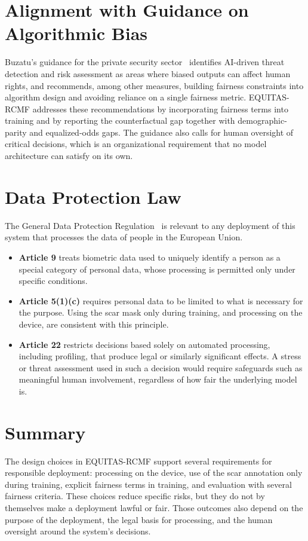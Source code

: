 \section{Alignment with Guidance on Algorithmic Bias}
Buzatu's guidance for the private security sector~\cite{buzatu2024} identifies AI-driven threat detection and risk assessment as areas where biased outputs can affect human rights, and recommends, among other measures, building fairness constraints into algorithm design and avoiding reliance on a single fairness metric. EQUITAS-RCMF addresses these recommendations by incorporating fairness terms into training and by reporting the counterfactual gap together with demographic-parity and equalized-odds gaps. The guidance also calls for human oversight of critical decisions, which is an organizational requirement that no model architecture can satisfy on its own.

\section{Data Protection Law}
The General Data Protection Regulation~\cite{gdpr2016} is relevant to any deployment of this system that processes the data of people in the European Union.
\begin{itemize}
    \item \textbf{Article 9} treats biometric data used to uniquely identify a person as a special category of personal data, whose processing is permitted only under specific conditions.
    \item \textbf{Article 5(1)(c)} requires personal data to be limited to what is necessary for the purpose. Using the scar mask only during training, and processing on the device, are consistent with this principle.
    \item \textbf{Article 22} restricts decisions based solely on automated processing, including profiling, that produce legal or similarly significant effects. A stress or threat assessment used in such a decision would require safeguards such as meaningful human involvement, regardless of how fair the underlying model is.
\end{itemize}

\section{Summary}
The design choices in EQUITAS-RCMF support several requirements for responsible deployment: processing on the device, use of the scar annotation only during training, explicit fairness terms in training, and evaluation with several fairness criteria. These choices reduce specific risks, but they do not by themselves make a deployment lawful or fair. Those outcomes also depend on the purpose of the deployment, the legal basis for processing, and the human oversight around the system's decisions.
